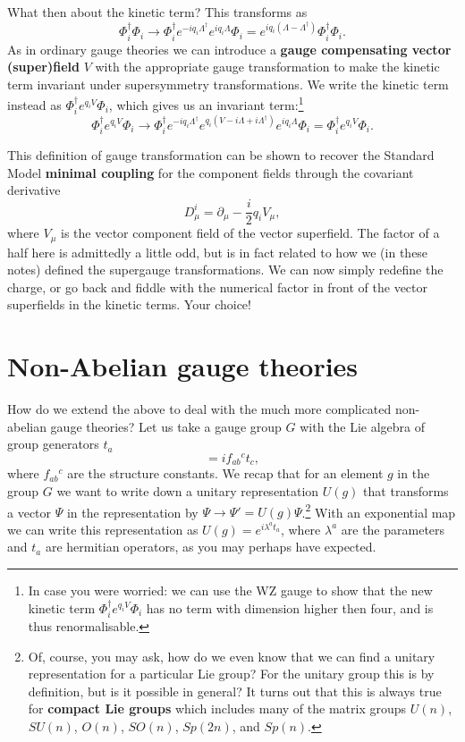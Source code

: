 \documentclass[notes.tex]{subfiles}
\begin{document}
What then about the kinetic term? This transforms as
\[\Phi^\dagger_i\Phi_i \to \Phi^\dagger_i e^{-iq_i\Lambda^\dagger }e^{iq_i\Lambda }\Phi_i = e^{iq_i(\Lambda - \Lambda^\dagger)}\Phi^\dagger_i\Phi_i.\]
As in  ordinary gauge theories we can introduce a {\bf gauge compensating vector (super)field} $V$ with the appropriate gauge transformation to make the kinetic term invariant under supersymmetry transformations. We write the kinetic term instead as $\Phi^\dagger_i e^{q_iV}\Phi_i$, which gives us an invariant term:\footnote{In case you were worried: we can use the WZ gauge to show that the new kinetic term $ \Phi^\dagger_ie^{q_iV}\Phi_i$ has no term with dimension higher then four, and is thus renormalisable.}
\[\Phi^\dagger_ie^{q_iV}\Phi_i \to \Phi^\dagger_i e^{-iq_i\Lambda^\dagger }e^{q_i(V - i\Lambda + i\Lambda^\dagger)}e^{iq_i\Lambda}\Phi_i = \Phi^\dagger_ie^{q_iV}\Phi_i.\]

This definition of gauge transformation can be shown to recover the Standard  Model {\bf minimal coupling} for the component fields through the covariant derivative
\[D_\mu^i = \partial_\mu -\frac{i}{2}q_iV_\mu,\]
where $V_\mu$ is the vector component field of the vector superfield. The factor of a half here is admittedly a little odd, but is in fact related to how we (in these notes) defined the supergauge transformations. We can now simply redefine the charge, or go back and fiddle with the numerical factor in front of the vector superfields in the kinetic terms. Your choice!


\section{Non-Abelian gauge theories}
How do we extend the above to deal with the much more complicated non-abelian gauge theories? Let us take a gauge group $G$ with the Lie algebra of group generators $t_a$ 
\begin{equation}
[t_a, t_b] = if_{ab}{}^c t_c,\label{eq:Liealgebrawta}
\end{equation} 
where $f_{ab}{}^{c}$ are the structure constants. We recap that for an element $g$ in the group $G$ we want to write down a unitary representation $U(g)$ that transforms a vector $\Psi$  in the representation by $\Psi \to \Psi' = U(g)\Psi$.\footnote{Of, course, you may ask, how do we even know that we can find a unitary representation for a particular Lie group? For the unitary group this is by definition, but is it possible in general? It turns out that this is always true for {\bf compact Lie groups} which includes many of the matrix groups $U(n)$, $SU(n)$, $O(n)$, $SO(n)$, $Sp(2n)$, and $Sp(n)$.}  
With an exponential map we can write this representation as $U(g) = e^{i\lambda^a t_a}$, where $\lambda^a$ are the parameters and $t_a$ are hermitian operators, as you may perhaps have expected.
\end{document}
